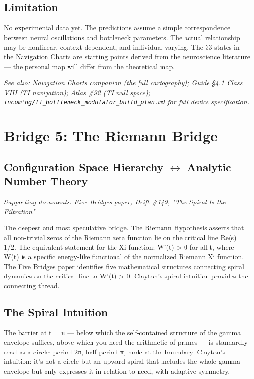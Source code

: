 \subsection*{Limitation}


No experimental data yet. The predictions assume a simple correspondence between neural oscillations and bottleneck parameters. The actual relationship may be nonlinear, context-dependent, and individual-varying. The 33 states in the Navigation Charts are starting points derived from the neuroscience literature — the personal map will differ from the theoretical map.


\textit{See also: Navigation Charts companion (the full cartography); Guide §4.1 Class VIII (TI navigation); Atlas \#92 (TI null space); \texttt{incoming/ti\_bottleneck\_modulator\_build\_plan.md} for full device specification.}


\bigskip\noindent\makebox[\textwidth]{\color{rulegray}\rule{5cm}{0.3pt}}\bigskip


\section*{Bridge 5: The Riemann Bridge}


\subsection*{Configuration Space Hierarchy $\leftrightarrow$ Analytic Number Theory}


\textit{Supporting documents: Five Bridges paper; Drift \#149, "The Spiral Is the Filtration"}


The deepest and most speculative bridge. The Riemann Hypothesis asserts that all non-trivial zeros of the Riemann zeta function lie on the critical line Re(s) = 1/2. The equivalent statement for the Xi function: W'(t) > 0 for all t, where W(t) is a specific energy-like functional of the normalized Riemann Xi function. The Five Bridges paper identifies five mathematical structures connecting spiral dynamics on the critical line to W'(t) > 0. Clayton's spiral intuition provides the connecting thread.


\subsection*{The Spiral Intuition}


The barrier at t = π — below which the self-contained structure of the gamma envelope suffices, above which you need the arithmetic of primes — is standardly read as a circle: period 2π, half-period π, node at the boundary. Clayton's intuition: it's not a circle but an upward spiral that includes the whole gamma envelope but only expresses it in relation to need, with adaptive symmetry.


